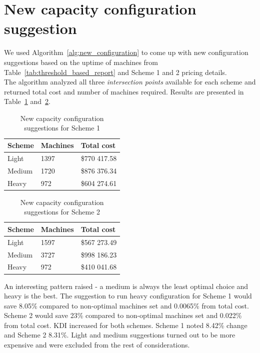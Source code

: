 \documentclass[]{final_report}
\begin{document}
\section{New capacity configuration suggestion}

We used Algorithm~\ref{alg:new_configuration} to come up with new configuration suggestions based on the uptime of machines from Table~\ref{tab:threshold_based_report} and Scheme 1 and 2 pricing details. \\
The algorithm analyzed all three \textit{intersection points} available for each scheme and returned total cost and number of machines required. Results are presented in Table~\ref{tab:new-cap-scheme1} and~\ref{tab:new-cap-scheme2}.

\begin{table}[h]
\begin{center}
    \begin{tabular}{| l | l | l |}
    \hline
    \textbf{Scheme} & \textbf{Machines} & \textbf{Total cost} \\
    \hline
    Light & 1397 & \$770 417.58 \\
    \hline
    Medium & 1720 & \$876 376.34 \\
    \hline
    Heavy & 972 & \$604 274.61\\
    \hline
    \end{tabular}
\end{center}
\caption{New capacity configuration suggestions for Scheme 1}
\label{tab:new-cap-scheme1}
\end{table}

\begin{table}[h]
\begin{center}
    \begin{tabular}{| l | l | l |}
    \hline
    \textbf{Scheme} & \textbf{Machines} & \textbf{Total cost} \\
    \hline
    Light & 1597 & \$567 273.49 \\
    \hline
    Medium & 3727 & \$998 186.23 \\
    \hline
    Heavy & 972 & \$410 041.68 \\
    \hline
    \end{tabular}
\end{center}
\caption{New capacity configuration suggestions for Scheme 2}
\label{tab:new-cap-scheme2}
\end{table}

An interesting pattern raised - a medium is always the least optimal choice and heavy is the best. The suggestion to run heavy configuration for Scheme 1 would save 8.05\% compared to non-optimal machines set and 0.0065\% from total cost. Scheme 2 would save 23\% compared to non-optimal machines set and 0.022\% from total cost. KDI increased for both schemes. Scheme 1 noted 8.42\% change and Scheme 2 8.31\%. Light and medium suggestions turned out to be more expensive and were excluded from the rest of considerations. \\
\end{document}
